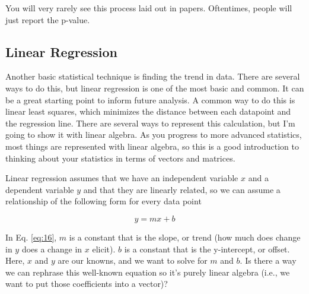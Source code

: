\documentclass{article}
\begin{document}
You will very rarely see this process laid out in papers. Oftentimes, people will just report the p-value. 

\subsection{Linear Regression}
Another basic statistical technique is finding the trend in data. There are several ways to do this, but linear regression is one of the most basic and common. It can be a great starting point to inform future analysis. A common way to do this is linear least squares, which  minimizes the distance between each datapoint and the regression line. There are several ways to represent this calculation, but I'm going to show it with linear algebra. As you progress to more advanced statistics, most things are represented with linear algebra, so this is a good introduction to thinking about your statistics in terms of vectors and matrices. 

Linear regression assumes that we have an independent variable $x$ and a dependent variable $y$ and that they are linearly related, so we can assume a relationship of the following form for every data point 

\begin{equation}
\label{eq:16}
y = m x + b
\end{equation}

In Eq. \ref{eq:16}, $m$ is a constant that is the slope, or trend (how much does change in $y$ does a change in $x$ elicit). $b$ is a constant that is the y-intercept, or offset. Here, $x$ and $y$ are our knowns, and we want to solve for $m$ and $b$. Is there a way we can rephrase this well-known equation so it's purely linear algebra (i.e., we want to put those coefficients into a vector)?
\end{document}
